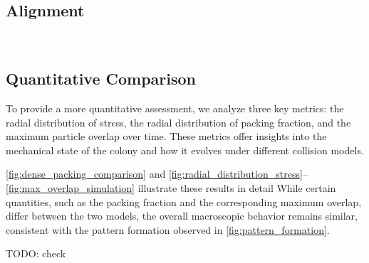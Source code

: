 \documentclass[conference]{IEEEtran}
\begin{document}
\subsection{Alignment}

~\cite{You_2021}


\subsection{Quantitative Comparison}

To provide a more quantitative assessment, we analyze three key metrics: the radial distribution of stress, the radial distribution of packing fraction, and the maximum particle overlap over time. These metrics offer insights into the mechanical state of the colony and how it evolves under different collision models.

\autoref{fig:dense_packing_comparison} and \autoref{fig:radial_distribution_stress}--\autoref{fig:max_overlap_simulation} illustrate these results in detail While certain quantities, such as the packing fraction and the corresponding maximum overlap, differ between the two models, the overall macroscopic behavior remains similar, consistent with the pattern formation observed in \autoref{fig:pattern_formation}.

TODO: check \cite{Warren2019}
\end{document}
